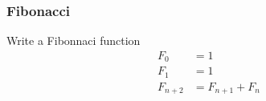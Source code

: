 \begin{frame}[fragile]
\frametitle{Fibonacci}

Write a Fibonnaci function
\begin{align*}
F_0 &= 1\\
F_1 &= 1\\
F_{n+2} &= F_{n+1} + F_n
\end{align*}
\end{frame}


